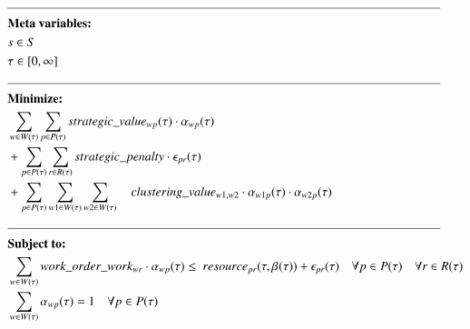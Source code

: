 
\newpage
\begin{alignat}{2}
	& \text{\rule{\linewidth}{0.4pt}} \notag\\
	& \textbf{Meta variables:} \notag\\
	& \ElementScheduler \in \SetScheduler \\
	& \tau \in [0, \infty] \\
	& \text{\rule{\linewidth}{0.4pt}} \notag\\
	& \textbf{Minimize:} \notag                                                                                                                                                        \\
	& \sum_{\ElementWorkOrder \in \SetWorkOrder{}} \sum_{\ElementPeriod \in \SetPeriod} \ParStrategicValue \cdot \VarStrategicWorkOrderAssignment{\ElementWorkOrder}{\ElementPeriod}  \notag\\ 
	& + \sum_{\ElementPeriod \in \SetPeriod} \sum_{\ElementResource \in \SetResource} \ParStrategicPenalty \cdot \VarStrategicExcess     \notag                                              \\
	& + \sum_{\ElementPeriod \in \SetPeriod} \sum_{\ElementWorkOrder1 \in \SetWorkOrder{}} \sum_{\ElementWorkOrder2 \in \SetWorkOrder{}} 	 \quad \ParClusteringValue \cdot \VarStrategicWorkOrderAssignment{\ElementWorkOrder1}{\ElementPeriod} \cdot \VarStrategicWorkOrderAssignment{\ElementWorkOrder2}{\ElementPeriod}  \\
	& \text{\rule{\linewidth}{0.4pt}} \notag\\
	& \textbf{Subject to:} \notag                                                                                                                                                      \\
	& \sum_{\ElementWorkOrder \in \SetWorkOrder{}} \ParStrategicWorkOrderWeight \cdot \VarStrategicWorkOrderAssignment{\ElementWorkOrder}{\ElementPeriod} \leq \ \ParStrategicResource + \VarStrategicExcess                                                                           \quad \forall \ElementPeriod \in \SetPeriod \quad \forall \ElementResource \in \SetResource                                                                                      \\
	& \sum_{\ElementWorkOrder \in \SetWorkOrder{}} \VarStrategicWorkOrderAssignment{\ElementWorkOrder}{\ElementPeriod} = 1              \quad \forall \ElementPeriod \in \SetPeriod                                                                                                                                      \\

\end{alignat}
